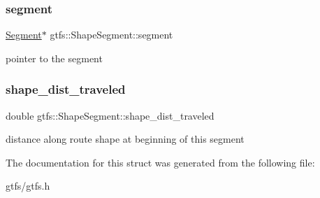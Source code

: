 \subsubsection{\texorpdfstring{segment}{segment}}
{\footnotesize\ttfamily \hyperlink{classgtfs_1_1Segment}{Segment}$\ast$ gtfs\+::\+Shape\+Segment\+::segment}

pointer to the segment \mbox{\label{structgtfs_1_1ShapeSegment_a64afdd03235b9bc256fc18652c6f9c47}} 
\subsubsection{\texorpdfstring{shape\+\_\+dist\+\_\+traveled}{shape\_dist\_traveled}}
{\footnotesize\ttfamily double gtfs\+::\+Shape\+Segment\+::shape\+\_\+dist\+\_\+traveled}

distance along route shape at beginning of this segment 

The documentation for this struct was generated from the following file\+:\begin{DoxyCompactItemize}
\item 
gtfs/gtfs.\+h\end{DoxyCompactItemize}
